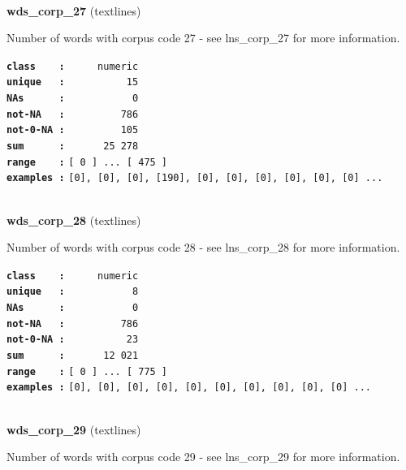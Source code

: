 \documentclass[]{article}
\begin{document}
~

\textbf{wds\_corp\_27} (textlines)

Number of words with corpus code 27 - see lns\_corp\_27 for more
information.

\textbf{\texttt{class\ \ \ \ :}} \texttt{~~~~~numeric}\\
\textbf{\texttt{unique\ \ \ :}} \texttt{~~~~~~~~~~15}\\
\textbf{\texttt{NAs\ \ \ \ \ \ :}} \texttt{~~~~~~~~~~~0}\\
\textbf{\texttt{not-NA\ \ \ :}} \texttt{~~~~~~~~~786}\\
\textbf{\texttt{not-0-NA\ :}} \texttt{~~~~~~~~~105}\\
\textbf{\texttt{sum\ \ \ \ \ \ :}} \texttt{~~~~~~25~278}\\
\textbf{\texttt{range\ \ \ \ :}}
\texttt{{[}\ 0\ {]}\ ...\ {[}\ 475\ {]}}\\
\textbf{\texttt{examples\ :}}
\texttt{{[}0{]},\ {[}0{]},\ {[}0{]},\ {[}190{]},\ {[}0{]},\ {[}0{]},\ {[}0{]},\ {[}0{]},\ {[}0{]},\ {[}0{]}\ ...}\\

~

\textbf{wds\_corp\_28} (textlines)

Number of words with corpus code 28 - see lns\_corp\_28 for more
information.

\textbf{\texttt{class\ \ \ \ :}} \texttt{~~~~~numeric}\\
\textbf{\texttt{unique\ \ \ :}} \texttt{~~~~~~~~~~~8}\\
\textbf{\texttt{NAs\ \ \ \ \ \ :}} \texttt{~~~~~~~~~~~0}\\
\textbf{\texttt{not-NA\ \ \ :}} \texttt{~~~~~~~~~786}\\
\textbf{\texttt{not-0-NA\ :}} \texttt{~~~~~~~~~~23}\\
\textbf{\texttt{sum\ \ \ \ \ \ :}} \texttt{~~~~~~12~021}\\
\textbf{\texttt{range\ \ \ \ :}}
\texttt{{[}\ 0\ {]}\ ...\ {[}\ 775\ {]}}\\
\textbf{\texttt{examples\ :}}
\texttt{{[}0{]},\ {[}0{]},\ {[}0{]},\ {[}0{]},\ {[}0{]},\ {[}0{]},\ {[}0{]},\ {[}0{]},\ {[}0{]},\ {[}0{]}\ ...}\\

~

\textbf{wds\_corp\_29} (textlines)

Number of words with corpus code 29 - see lns\_corp\_29 for more
information.
\end{document}
